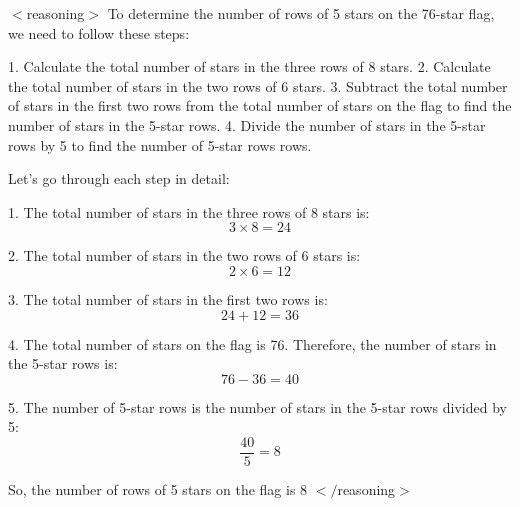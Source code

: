 \begin{tcolorbox}[title=\textbf{Model:} LLaDA-8B-Instruct \\ 
\textbf{Generation Sequence Length:} 512 \\ \textbf{Question:} A 76-star flag has three rows of 8 stars\, two rows of 6 stars and the rest are 5-star rows. How many rows of 5 stars are there altogether on the flag?]
$<$reasoning$>$
To determine the number of rows of 5 stars on the 76-star flag, we need to follow these steps:

1. Calculate the total number of stars in the three rows of 8 stars.
2. Calculate the total number of stars in the two rows of 6 stars.
3. Subtract the total number of stars in the first two rows from the total number of stars on the flag to find the number of stars in the 5-star rows.
4. Divide the number of stars in the 5-star rows by 5 to find the number of 5-star rows rows.

Let's go through each step in detail:

1. The total number of stars in the three rows of 8 stars is:
   \[
   3 \times 8 = 24
   \]

2. The total number of stars in the two rows of 6 stars is:
   \[
   2 \times 6 = 12
   \]

3. The total number of stars in the first two rows is:
   \[
   24 + 12 = 36
   \]

4. The total number of stars on the flag is 76. Therefore, the number of stars in the 5-star rows is:
   \[
   76 - 36 = 40
   \]

5. The number of 5-star rows is the number of stars in the 5-star rows divided by 5:
   \[
   \frac{40}{5} = 8
   \]

So, the number of rows of 5 stars on the flag is \textcolor{green!70!black}{\(\boxed{8}\)}
$</$reasoning$>$
\end{tcolorbox}
